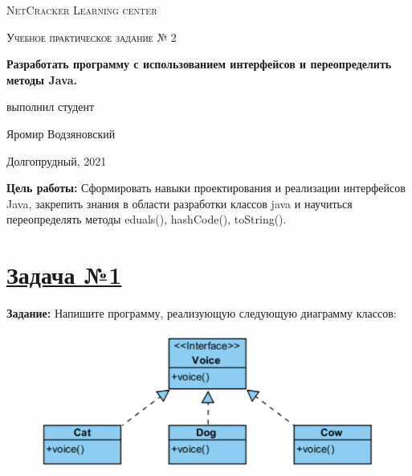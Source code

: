 \documentclass[a4paper]{article}
\begin{document}
\graphicspath{ {pictures/} }

\begin{titlepage}
	\centering
	\vspace{5cm}
    {\scshape\LARGE NetCracker Learning center\par}
	\vspace{5cm}
	{\scshape\Large  Учебное практическое задание № 2 \par}
	\vspace{1cm}
    {\huge\bfseries  Разработать программу с использованием интерфейсов и переопределить методы Java. \par}
	\vspace{1cm}
	\vfill
    \begin{flushright}
        {\large выполнил студент}\par
        \vspace{0.3cm}
        {\LARGE Яромир Водзяновский}
    \end{flushright}
	\vfill
Долгопрудный, 2021
\end{titlepage}

\pagestyle{fancy} 
\fancyfoot[C]{ \noindent\rule{\textwidth}{0.4pt} \thepage }



\newpage 


\textbf{Цель работы: }
Сформировать навыки проектирования и реализации интерфейсов Java, закрепить знания в области разработки классов java и научиться переопределять методы eduals(), hashCode(), toString().

\section{\href{https://github.com/yarvod/NetCracker_LearningCenter/tree/main/Practise_tasks/Practice_task_2/task_1}{Задача №1}}

\textbf{Задание:} Напишите программу, реализующую следующую диаграмму классов: \par

\begin{figure}[H]
    \begin{center}
        \includegraphics[scale = 0.5]{task1.png}
    \end{center}
\end{figure}
\end{document}
